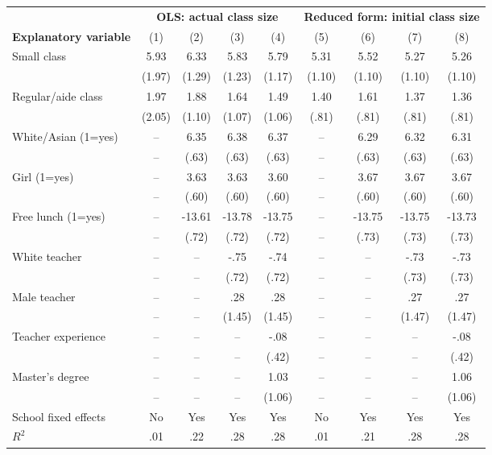 \documentclass[12pt]{article}
\begin{document}
\begin{table}[H]
\centering
\begin{tabular}{lcccccccc}
 & \multicolumn{4}{c}{\textbf{OLS: actual class size}} & \multicolumn{4}{c}{\textbf{Reduced form: initial class size}} \\
\textbf{Explanatory variable} & (1) & (2) & (3) & (4) & (5) & (6) & (7) & (8) \\
\hline
Small class & 5.93 & 6.33 & 5.83 & 5.79 & 5.31 & 5.52 & 5.27 & 5.26 \\
 & (1.97) & (1.29) & (1.23) & (1.17) & (1.10) & (1.10) & (1.10) & (1.10) \\
Regular/aide class & 1.97 & 1.88 & 1.64 & 1.49 & 1.40 & 1.61 & 1.37 & 1.36 \\
 & (2.05) & (1.10) & (1.07) & (1.06) & (.81) & (.81) & (.81) & (.81) \\
White/Asian (1=yes) & -- & 6.35 & 6.38 & 6.37 & -- & 6.29 & 6.32 & 6.31 \\
 & -- & (.63) & (.63) & (.63) & -- & (.63) & (.63) & (.63) \\
Girl (1=yes) & -- & 3.63 & 3.63 & 3.60 & -- & 3.67 & 3.67 & 3.67 \\
 & -- & (.60) & (.60) & (.60) & -- & (.60) & (.60) & (.60) \\
Free lunch (1=yes) & -- & -13.61 & -13.78 & -13.75 & -- & -13.75 & -13.75 & -13.73 \\
 & -- & (.72) & (.72) & (.72) & -- & (.73) & (.73) & (.73) \\
White teacher & -- & -- & -.75 & -.74 & -- & -- & -.73 & -.73 \\
 & -- & -- & (.72) & (.72) & -- & -- & (.73) & (.73) \\
Male teacher & -- & -- & .28 & .28 & -- & -- & .27 & .27 \\
 & -- & -- & (1.45) & (1.45) & -- & -- & (1.47) & (1.47) \\
Teacher experience & -- & -- & -- & -.08 & -- & -- & -- & -.08 \\
 & -- & -- & -- & (.42) & -- & -- & -- & (.42) \\
Master's degree & -- & -- & -- & 1.03 & -- & -- & -- & 1.06 \\
 & -- & -- & -- & (1.06) & -- & -- & -- & (1.06) \\
\hline
School fixed effects & No & Yes & Yes & Yes & No & Yes & Yes & Yes \\
$R^2$ & .01 & .22 & .28 & .28 & .01 & .21 & .28 & .28 \\
\end{tabular}
\end{table}
\end{document}
